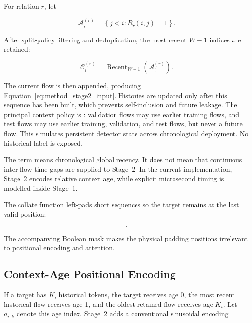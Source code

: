\documentclass[11pt,fleqn]{report}
\begin{document}
For relation $r$, let

\begin{equation}
    \mathcal{A}^{(r)}_i
    =\left\{j<i:R_r(i,j)=1\right\}.
    \label{eq:method_eligible_context}
\end{equation}

After split-policy filtering and deduplication, the most recent $W-1$ indices
are retained:

\begin{equation}
    \mathcal{C}^{(r)}_i
    =\operatorname{Recent}_{W-1}
      \left(\mathcal{A}^{(r)}_i\right).
    \label{eq:recent_context}
\end{equation}

The current flow is then appended, producing
Equation~\ref{eq:method_stage2_input}. Histories are updated only after this
sequence has been built, which prevents self-inclusion and future leakage. The
principal context policy is : validation flows may use
earlier training flows, and test flows may use earlier training, validation,
and test flows, but never a future flow. This simulates persistent detector
state across chronological deployment. No historical label is exposed.

The term  means chronological global recency. It does
not mean that continuous inter-flow time gaps are supplied to Stage~2. In the
current implementation, Stage~2 encodes relative context age, while explicit
microsecond timing is modelled inside Stage~1.

The collate function left-pads short sequences so the target remains at the last
valid position:

\begin{equation}
    [\mathrm{PAD},\ldots,\mathrm{PAD},
      \mathbf{z}^{(1)}_{j_1},\ldots,
      \mathbf{z}^{(1)}_{j_{K_i}},
      \mathbf{z}^{(1)}_i].
    \label{eq:left_padded_context}
\end{equation}

The accompanying Boolean mask makes the physical padding positions irrelevant
to positional encoding and attention.

\subsection{Context-Age Positional Encoding}
\label{subsubsec:context_age_encoding}

If a target has $K_i$ historical tokens, the target receives age 0, the most
recent historical flow receives age 1, and the oldest retained flow receives
age $K_i$. Let $a_{i,k}$ denote this age index. Stage~2 adds a conventional
sinusoidal encoding
\end{document}
